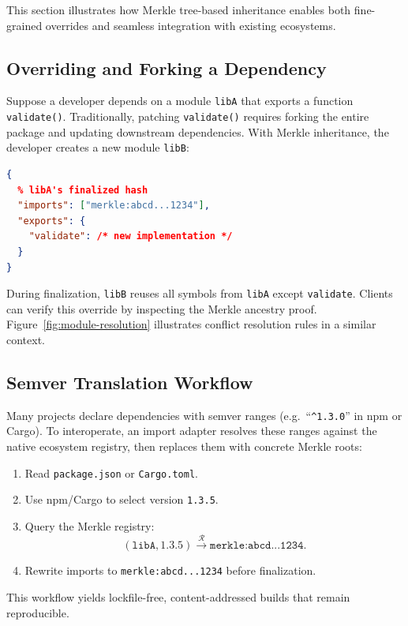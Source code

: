 \documentclass[sigplan,screen]{acmart}
\begin{document}
This section illustrates how Merkle tree-based inheritance enables both fine-grained overrides and seamless integration with existing ecosystems.

\subsection{Overriding and Forking a Dependency}
Suppose a developer depends on a module \texttt{libA} that exports a function \texttt{validate()}. Traditionally, patching \texttt{validate()} requires forking the entire package and updating downstream dependencies. With Merkle inheritance, the developer creates a new module \texttt{libB}:

\begin{lstlisting}[language=json, basicstyle=\ttfamily\small,caption={Override of \texttt{validate()} in a new module}]
{
  % libA's finalized hash
  "imports": ["merkle:abcd...1234"],
  "exports": {
    "validate": /* new implementation */
  }
}
\end{lstlisting}

\noindent During finalization, \texttt{libB} reuses all symbols from \texttt{libA} except \texttt{validate}. Clients can verify this override by inspecting the Merkle ancestry proof. Figure~\ref{fig:module-resolution} illustrates conflict resolution rules in a similar context.

\subsection{Semver Translation Workflow}
Many projects declare dependencies with semver ranges (e.g.\ ``\verb|^1.3.0|'' in npm or Cargo). To interoperate, an import adapter resolves these ranges against the native ecosystem registry, then replaces them with concrete Merkle roots:

\begin{enumerate}
	\item Read \texttt{package.json} or \texttt{Cargo.toml}.
	\item Use npm/Cargo to select version \texttt{1.3.5}.
	\item Query the Merkle registry: 
		\[
			(\texttt{libA},1.3.5) \xrightarrow{\mathcal{R}} \texttt{merkle:abcd...1234}.
		\]
	\item Rewrite imports to \texttt{merkle:abcd...1234} before finalization.
\end{enumerate}

This workflow yields lockfile-free, content-addressed builds that remain reproducible.
\end{document}
